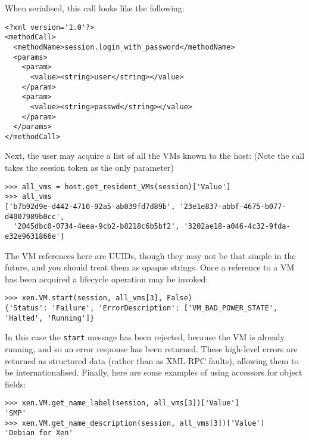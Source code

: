 When serialised, this call looks like the following:

\begin{verbatim}
<?xml version='1.0'?>
<methodCall>
  <methodName>session.login_with_password</methodName>
  <params>
    <param>
      <value><string>user</string></value>
    </param>
    <param>
      <value><string>passwd</string></value>
    </param>
  </params>
</methodCall>
\end{verbatim}

Next, the user may acquire a list of all the VMs known to the host: (Note the
call takes the session token as the only parameter)

\begin{verbatim}
>>> all_vms = host.get_resident_VMs(session)['Value']
>>> all_vms
['b7b92d9e-d442-4710-92a5-ab039fd7d89b', '23e1e837-abbf-4675-b077-d4007989b0cc',
  '2045dbc0-0734-4eea-9cb2-b8218c6b5bf2', '3202ae18-a046-4c32-9fda-e32e9631866e']
\end{verbatim}

The VM references here are UUIDs, though they may not be that simple in the
future, and you should treat them as opaque strings.  Once a reference to a VM
has been acquired a lifecycle operation may be invoked:

\begin{verbatim}
>>> xen.VM.start(session, all_vms[3], False)
{'Status': 'Failure', 'ErrorDescription': ['VM_BAD_POWER_STATE', 'Halted', 'Running']}
\end{verbatim}

In this case the {\tt start} message has been rejected, because the VM is
already running, and so an error response has been returned.  These high-level
errors are returned as structured data (rather than as XML-RPC faults),
allowing them to be internationalised.  Finally, here are some examples of
using accessors for object fields:

\begin{verbatim}
>>> xen.VM.get_name_label(session, all_vms[3])['Value']
'SMP'
>>> xen.VM.get_name_description(session, all_vms[3])['Value']
'Debian for Xen'
\end{verbatim}
